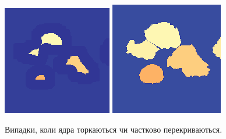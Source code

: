 \begin{figure}[b!]
	\includegraphics[width=0.97\linewidth]{Figures/Chapter2/6b4.png}	
	\includegraphics[width=0.97\linewidth]{Figures/Chapter2/6c4.png}
	\endminipage\hfill
	
	\caption{Випадки, коли ядра торкаються чи частково перекриваються.}
	\label{fig:amazing_segmentation}
\end{figure}

